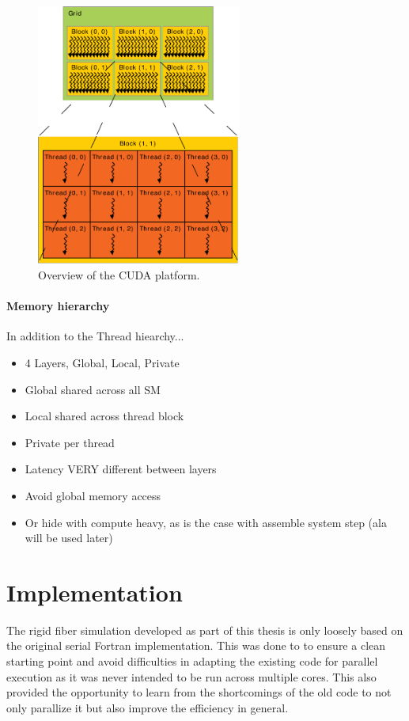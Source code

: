 \documentclass[a4paper,11pt]{kth-mag}
\begin{document}
\begin{figure}
  \centering
  \includegraphics[width=0.6\textwidth]{img/grid_blocks.pdf}
  \caption{Overview of the CUDA platform.}
  \label{fig:grid_blocks}
\end{figure}

\paragraph{Memory hierarchy}

In addition to the Thread hiearchy...

\begin{itemize}
\item 4 Layers, Global, Local, Private
\item Global shared across all SM
\item Local shared across thread block
\item Private per thread
\item Latency VERY different between layers
\item Avoid global memory access
\item Or hide with compute heavy, as is the case with assemble system step (ala will be used later)
\end{itemize}

\section{Implementation}
The rigid fiber simulation developed as part of this thesis is only loosely based on the original serial Fortran implementation. This was done to to ensure a clean starting point and avoid difficulties in adapting the existing code for parallel execution as it was never intended to be run across multiple cores. This also provided the opportunity to learn from the shortcomings of the old code to not only parallize it but also improve the efficiency in general.
\end{document}
